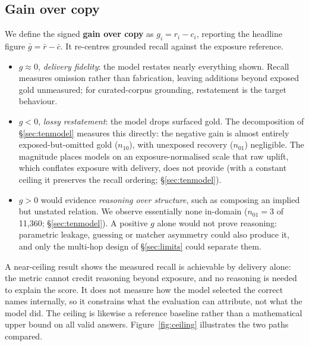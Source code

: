 \documentclass[10pt,twocolumn]{article}
\begin{document}
\subsection{Gain over copy}
We define the signed \textbf{gain over copy} as $g_i=r_i-c_i$, reporting the headline figure $\bar g=\bar r-\bar c$. It re-centres grounded recall against the exposure reference.
\begin{itemize}[topsep=2pt,itemsep=1pt,leftmargin=1.4em]
\item $g\approx0$, \emph{delivery fidelity}: the model restates nearly everything shown. Recall measures omission rather than fabrication, leaving additions beyond exposed gold unmeasured; for curated-corpus grounding, restatement is the target behaviour.
\item $g<0$, \emph{lossy restatement}: the model drops surfaced gold. The decomposition of \S\ref{sec:tenmodel} measures this directly: the negative gain is almost entirely exposed-but-omitted gold ($n_{10}$), with unexposed recovery ($n_{01}$) negligible. The magnitude places models on an exposure-normalised scale that raw uplift, which conflates exposure with delivery, does not provide (with a constant ceiling it preserves the recall ordering; \S\ref{sec:tenmodel}).
\item $g>0$ would evidence \emph{reasoning over structure}, such as composing an implied but unstated relation. We observe essentially none in-domain ($n_{01}=3$ of 11{,}360; \S\ref{sec:tenmodel}). A positive $g$ alone would not prove reasoning: parametric leakage, guessing or matcher asymmetry could also produce it, and only the multi-hop design of \S\ref{sec:limits} could separate them.
\end{itemize}
A near-ceiling result shows the measured recall is achievable by delivery alone: the metric cannot credit reasoning beyond exposure, and no reasoning is needed to explain the score. It does not measure how the model selected the correct names internally, so it constrains what the evaluation can attribute, not what the model did. The ceiling is likewise a reference baseline rather than a mathematical upper bound on all valid answers. Figure~\ref{fig:ceiling} illustrates the two paths compared.


\end{document}
